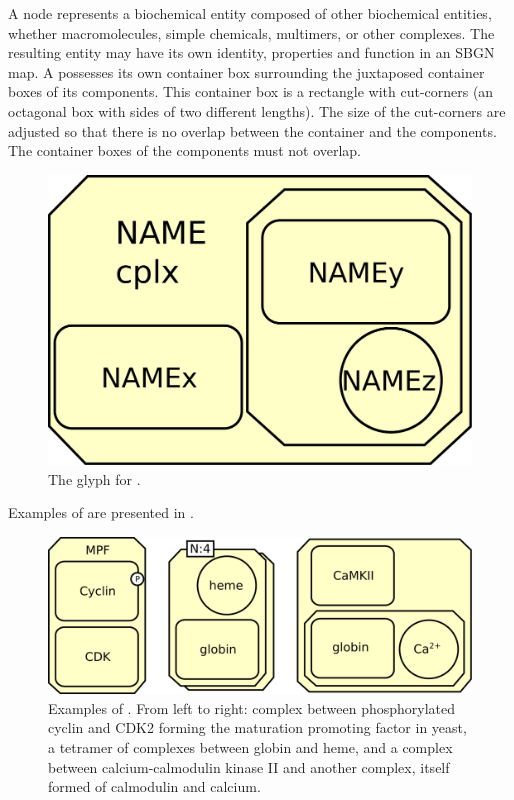 A  node represents a biochemical entity composed of other biochemical entities, whether macromolecules, simple chemicals, multimers, or other complexes. The resulting entity may have its own identity, properties and function in an SBGN map. A  possesses its own container box surrounding the juxtaposed container boxes of its components.  This container box is a rectangle with cut-corners (an octagonal box with sides of two different lengths).  The size of the cut-corners are adjusted so that there is no overlap between the container and the components.  The container boxes of the components must not overlap.

\begin{figure}[htb]
  \centering
  \includegraphics[scale = 0.3]{le_images/complex}
  \caption{The \PD glyph for .}
  \label{fig:complex}
\end{figure}


Examples of  are presented in .

\begin{figure}[htb]
  \centering
  \includegraphics[scale = 0.5]{le_images/complex-examples}
  \caption{Examples of . From left to right: complex between phosphorylated cyclin and CDK2 forming the maturation promoting factor in yeast, a tetramer of complexes between globin and heme, and a complex between calcium-calmodulin kinase II and another complex, itself formed of calmodulin and calcium.}
  \label{fig:complex-examples}
\end{figure}

